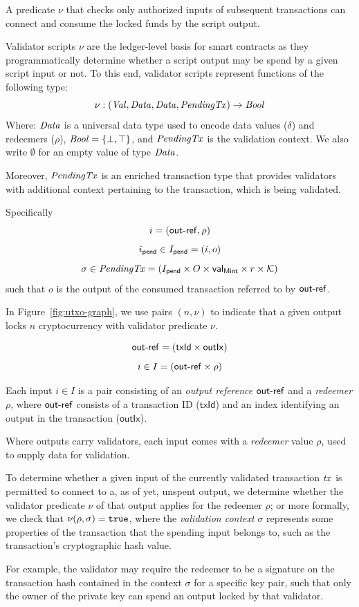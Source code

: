 \begin{definition}
A predicate $\nu$ that checks only authorized inputs of subsequent transactions can
connect and consume the locked funds by the script output.

Validator scripts $\nu$ are the ledger-level basis for smart
contracts as they programmatically determine whether a script output
may be spend by a given script input or not. To this end, validator
scripts represent functions of the following type:
\[
  \nu : (\mathit{Val}, \mathit{Data}, \mathit{Data}, \mathit{PendingTx})
  \to\mathit{Bool}
\]
Where: $\mathit{Data}$ is a universal data type used to encode data
values ($\delta$) and redeemers ($\rho$), $\mathit{Bool} = \{\bot, \top\}$, and $\mathit{PendingTx}$ is the validation context. We also
write $\emptyset$ for an empty value of type $\mathit{Data}$.  

Moreover,
$\mathit{PendingTx}$ is an enriched transaction type that provides
validators with additional context pertaining to the transaction,
which is being validated.  

Specifically
\[
  i = (\mathsf{out\textsf{-}{}ref}, \rho)
\]
\[
 i_{\mathsf{pend}} \in I_{\mathsf{pend}} = (i, o)
\]
\[
 \sigma \in \mathit{PendingTx} = (I_{\mathsf{pend}} \times O \times \mathsf{val}_\mathsf{Mint} \times r \times \mathcal K) 
\]
such that $o$ is the output of the
consumed transaction referred to by $\mathsf{out\textsf{-}{}ref}$.

In Figure~\ref{fig:utxo-graph}, we use pairs \((n, \nu)\) to indicate that a given output locks $n$ cryptocurrency with validator predicate $\nu$.
\end{definition}

\begin{definition}[Inputs]
$$\mathsf{out\textsf{-}{}ref} = (\mathsf{txId} \times \mathsf{outIx})$$
$$i \in I = (\mathsf{out\textsf{-}{}ref} \times \rho)$$

Each input \(i\in I\) is a pair consisting of an \emph{output reference} $\mathsf{out\textsf{-}{}ref}$ and a \emph{redeemer} $\rho$, where $\mathsf{out\textsf{-}{}ref}$ consists of a transaction ID ($\mathsf{txId}$) and an index identifying an output in the transaction ($\mathsf{outIx}$).
\end{definition}

\begin{definition}[Redeemer]
Where outputs carry validators, each input comes with a \emph{redeemer} value $\rho$, used to supply data for validation. 

To determine whether a given input of the currently validated transaction $\mathit{tx}$ is permitted to connect to a, as of yet, unspent output, we determine whether the validator predicate $\nu$ of that output applies for the redeemer $\rho$; or more formally, we check that \(\nu(\rho, \sigma) = \mathtt{true}\), where the \emph{validation context} $\sigma$ represents some properties of the transaction that the spending input belongs to, such as the transaction's cryptographic hash value. 

For example, the validator may require the redeemer to be a signature on the transaction hash contained in the context $\sigma$ for a specific key pair, such that only the owner of the private key can spend an output locked by that validator.
\end{definition}

